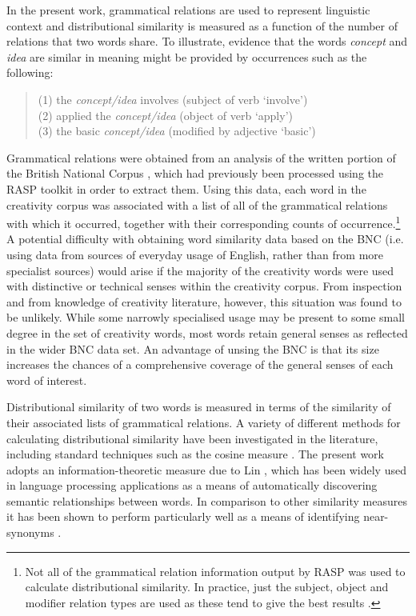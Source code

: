 \documentclass[10pt,letterpaper]{article}
\begin{document}
In the present work, grammatical relations are used to represent linguistic context  and distributional similarity is measured as a function of the number of  relations 
that two words share. To illustrate, evidence that the words {\em concept} and {\em idea} are similar in meaning might be provided by occurrences such as the following: 

\begin{quote}
(1) the {\em concept/idea} involves \hfill (subject of verb `involve')\\
(2) applied the {\em concept/idea\/} \hfill (object of verb `apply') \\
(3) the basic {\em concept/idea\/} \hfill (modified by adjective `basic')
\end{quote}

\noindent
Grammatical relations were obtained from an analysis of the written portion of the British National Corpus \cite{leech92}, which had previously been processed using the RASP toolkit \cite{briscoe06} in order to extract them. Using this data, each word in the creativity corpus was associated with a list of all of the grammatical relations with which it occurred, together with their corresponding counts of occurrence.\footnote{Not all of the grammatical relation information output by RASP was used to calculate distributional similarity. In practice, just the subject, object and modifier relation types are used as these tend to give the best results \cite{weeds03}.} A potential difficulty with obtaining word similarity data based on the BNC (i.e. using data from sources of everyday usage of English, rather than from more specialist sources) would arise if the majority of the creativity words were used with distinctive or technical senses within the creativity corpus. From inspection and from knowledge of creativity literature, however, this situation was found to be unlikely. While some narrowly specialised usage may be present to some small degree in the set of creativity words, most words retain general senses as reflected in the wider BNC data set. An advantage of unsing the BNC is that its  size increases the chances of a comprehensive coverage of the general senses of each word of interest.

Distributional similarity of two words is measured in terms of the similarity of their associated lists of grammatical relations. A variety of different methods for calculating distributional similarity have been investigated in the literature, including standard techniques such as the cosine measure \cite[for example]{mannschu99}. The present work adopts an information-theoretic measure due to Lin \cite{lin98}, which has been widely used in language processing applications as a means of automatically discovering semantic relationships between words. In comparison to other similarity measures it has been shown to perform particularly well as a means of identifying near-synonyms \cite{weedsweir03,mccanavi09}.
\end{document}

